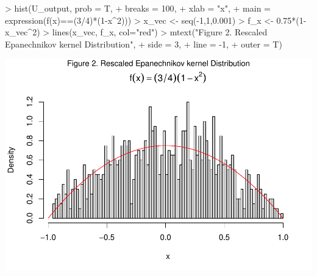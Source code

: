 \documentclass[
]{article}
\newenvironment{Shaded}{\begin{snugshade}}{\end{snugshade}}
\newcommand{\AttributeTok}[1]{\textcolor[rgb]{0.77,0.63,0.00}{#1}}
\newcommand{\DecValTok}[1]{\textcolor[rgb]{0.00,0.00,0.81}{#1}}
\newcommand{\FloatTok}[1]{\textcolor[rgb]{0.00,0.00,0.81}{#1}}
\newcommand{\FunctionTok}[1]{\textcolor[rgb]{0.00,0.00,0.00}{#1}}
\newcommand{\NormalTok}[1]{#1}
\newcommand{\OtherTok}[1]{\textcolor[rgb]{0.56,0.35,0.01}{#1}}
\newcommand{\SpecialCharTok}[1]{\textcolor[rgb]{0.00,0.00,0.00}{#1}}
\newcommand{\StringTok}[1]{\textcolor[rgb]{0.31,0.60,0.02}{#1}}
\begin{document}
\begin{Shaded}
\begin{Highlighting}[]
\SpecialCharTok{\textgreater{}} \FunctionTok{hist}\NormalTok{(U\_output, }\AttributeTok{prob =}\NormalTok{ T, }
\SpecialCharTok{+}      \AttributeTok{breaks =} \DecValTok{100}\NormalTok{, }
\SpecialCharTok{+}      \AttributeTok{xlab =} \StringTok{"x"}\NormalTok{,}
\SpecialCharTok{+}      \AttributeTok{main =} \FunctionTok{expression}\NormalTok{(}\FunctionTok{f}\NormalTok{(x)}\SpecialCharTok{==}\NormalTok{(}\DecValTok{3}\SpecialCharTok{/}\DecValTok{4}\NormalTok{)}\SpecialCharTok{*}\NormalTok{(}\DecValTok{1}\SpecialCharTok{{-}}\NormalTok{x}\SpecialCharTok{\^{}}\DecValTok{2}\NormalTok{)))}
\SpecialCharTok{\textgreater{}}\NormalTok{ x\_vec }\OtherTok{\textless{}{-}} \FunctionTok{seq}\NormalTok{(}\SpecialCharTok{{-}}\DecValTok{1}\NormalTok{,}\DecValTok{1}\NormalTok{,}\FloatTok{0.001}\NormalTok{)}
\SpecialCharTok{\textgreater{}}\NormalTok{ f\_x }\OtherTok{\textless{}{-}} \FloatTok{0.75}\SpecialCharTok{*}\NormalTok{(}\DecValTok{1}\SpecialCharTok{{-}}\NormalTok{x\_vec}\SpecialCharTok{\^{}}\DecValTok{2}\NormalTok{)}
\SpecialCharTok{\textgreater{}} \FunctionTok{lines}\NormalTok{(x\_vec, f\_x, }\AttributeTok{col=}\StringTok{"red"}\NormalTok{)}
\SpecialCharTok{\textgreater{}} \FunctionTok{mtext}\NormalTok{(}\StringTok{"Figure 2. Rescaled Epanechnikov kernel Distribution"}\NormalTok{,}
\SpecialCharTok{+}       \AttributeTok{side =} \DecValTok{3}\NormalTok{,}
\SpecialCharTok{+}       \AttributeTok{line =} \SpecialCharTok{{-}}\DecValTok{1}\NormalTok{,}
\SpecialCharTok{+}       \AttributeTok{outer =}\NormalTok{ T)}
\end{Highlighting}
\end{Shaded}

\includegraphics[width=1\linewidth,height=0.4\textheight]{HW_02_Chenguang_Pan_files/figure-latex/unnamed-chunk-3-1}
\end{document}
